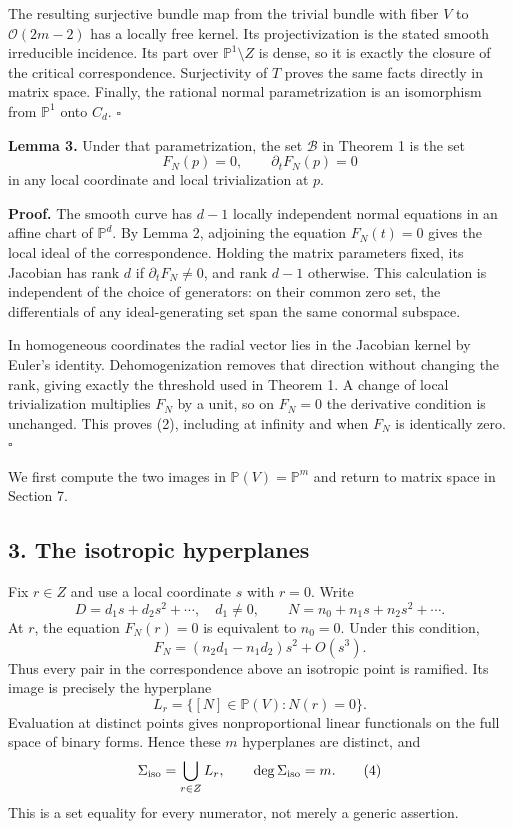 \documentclass[
  11pt,
]{article}
\begin{document}
The resulting surjective bundle map from the trivial bundle with fiber
\(V\) to \(\mathcal O(2m-2)\) has a locally free kernel. Its
projectivization is the stated smooth irreducible incidence. Its part
over \(\mathbb P^1\setminus Z\) is dense, so it is exactly the closure
of the critical correspondence. Surjectivity of \(T\) proves the same
facts directly in matrix space. Finally, the rational normal
parametrization is an isomorphism from \(\mathbb P^1\) onto \(C_d\).
\(\square\)

\textbf{Lemma 3.} Under that parametrization, the set \(\mathcal B\) in
Theorem 1 is the set \[
 F_N(p)=0,\qquad \partial_tF_N(p)=0
 \tag{2}
\] in any local coordinate and local trivialization at \(p\).

\textbf{Proof.} The smooth curve has \(d-1\) locally independent normal
equations in an affine chart of \(\mathbb P^d\). By Lemma 2, adjoining
the equation \(F_N(t)=0\) gives the local ideal of the correspondence.
Holding the matrix parameters fixed, its Jacobian has rank \(d\) if
\(\partial_tF_N\ne0\), and rank \(d-1\) otherwise. This calculation is
independent of the choice of generators: on their common zero set, the
differentials of any ideal-generating set span the same conormal
subspace.

In homogeneous coordinates the radial vector lies in the Jacobian kernel
by Euler's identity. Dehomogenization removes that direction without
changing the rank, giving exactly the threshold used in Theorem 1. A
change of local trivialization multiplies \(F_N\) by a unit, so on
\(F_N=0\) the derivative condition is unchanged. This proves (2),
including at infinity and when \(F_N\) is identically zero. \(\square\)

We first compute the two images in \(\mathbb P(V)=\mathbb P^m\) and
return to matrix space in Section 7.

\subsection{3. The isotropic
hyperplanes}\label{the-isotropic-hyperplanes}

Fix \(r\in Z\) and use a local coordinate \(s\) with \(r=0\). Write \[
 D=d_1s+d_2s^2+\cdots,\quad d_1\ne0,\qquad
 N=n_0+n_1s+n_2s^2+\cdots.
\] At \(r\), the equation \(F_N(r)=0\) is equivalent to \(n_0=0\). Under
this condition, \[
 F_N=(n_2d_1-n_1d_2)s^2+O(s^3).
 \tag{3}
\] Thus every pair in the correspondence above an isotropic point is
ramified. Its image is precisely the hyperplane \[
 L_r=\{[N]\in\mathbb P(V):N(r)=0\}.
\] Evaluation at distinct points gives nonproportional linear
functionals on the full space of binary forms. Hence these \(m\)
hyperplanes are distinct, and \[
 \Sigma_{\rm iso}=\bigcup_{r\in Z}L_r,\qquad
 \deg\Sigma_{\rm iso}=m.
 \tag{4}
\] This is a set equality for every numerator, not merely a generic
assertion.
\end{document}
